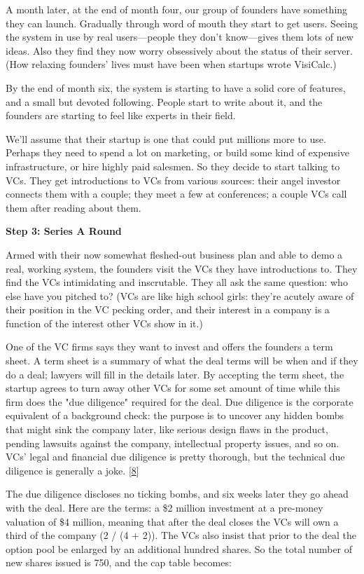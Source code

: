 A month later, at the end of month four, our group of founders have
something they can launch.  Gradually through word of mouth they
start to get users.  Seeing the system in use by real users---people
they don't know---gives them lots of new ideas.  Also they find
they now worry obsessively about the status of their server.  (How
relaxing founders' lives must have been when startups wrote VisiCalc.)

By the end of month six, the system is starting to have a solid
core of features, and a small but devoted following.  People start
to write about it, and the founders are starting to feel like experts
in their field.

We'll assume that their startup is one that could put millions more
to use.  Perhaps they need to spend a lot on marketing, or build
some kind of expensive infrastructure, or hire highly paid salesmen.
So they decide to start talking to VCs.  They get introductions to
VCs from various sources: their angel investor connects them with
a couple; they meet a few at conferences; a couple VCs call them
after reading about them.

\textbf{Step 3: Series A Round}

Armed with their now somewhat fleshed-out business plan and able
to demo a real, working system, the founders visit the VCs they
have introductions to.  They find the VCs intimidating and inscrutable.
They all ask the same question: who else have you pitched to?  (VCs
are like high school girls: they're acutely aware of their position
in the VC pecking order, and their interest in a company is a
function of the interest other VCs show in it.)

One of the VC firms says they want to invest and offers the founders
a term sheet.  A term sheet is a summary of what the deal terms
will be when and if they do a deal; lawyers will fill in the details
later.  By accepting the term sheet, the startup agrees to turn
away other VCs for some set amount of time while this firm does the
"due diligence" required for the deal.  Due diligence is the corporate
equivalent of a background check: the purpose is to uncover any
hidden bombs that might sink the company later, like serious design
flaws in the product, pending lawsuits against the company,
intellectual property issues, and so on.  VCs' legal and financial
due diligence is pretty thorough, but the technical due diligence
is generally a joke.  
[\href{\#f8n}{8}]

The due diligence discloses no ticking bombs, and six weeks later
they go ahead with the deal.  Here are the terms: a \$2 million
investment at a pre-money valuation of \$4 million, meaning that
after the deal closes the VCs will own a third of the company (2 /
(4 + 2)).  The VCs also insist that prior to the deal the option
pool be enlarged by an additional hundred shares.  So the total
number of new shares issued is 750, and the cap table becomes:

